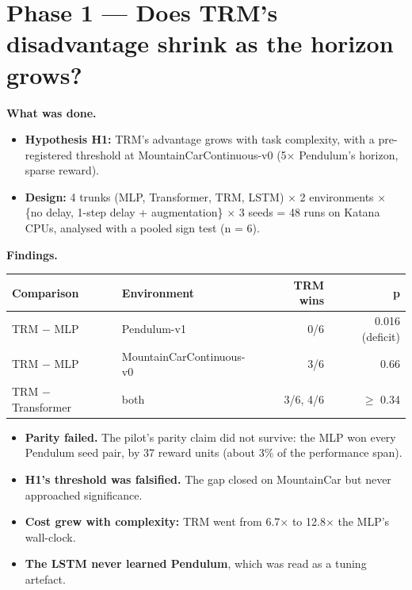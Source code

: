 \documentclass[11pt]{article}
\begin{document}
\medskip



\section*{Phase 1 --- Does TRM's disadvantage shrink as the horizon grows?}



\textbf{What was done.}

\begin{itemize}
\item \textbf{Hypothesis H1:} TRM's advantage grows with task complexity, with a pre-registered threshold at MountainCarContinuous-v0 (5$\times$ Pendulum's horizon, sparse reward).
\item \textbf{Design:} 4 trunks (MLP, Transformer, TRM, LSTM) $\times$ 2 environments $\times$ \{no delay, 1-step delay + augmentation\} $\times$ 3 seeds = 48 runs on Katana CPUs, analysed with a pooled sign test (n = 6).
\end{itemize}



\textbf{Findings.}



\begin{center}\small\begin{tabular}{llrr}
\toprule
Comparison & Environment & TRM wins & p \\
\midrule
TRM $-$ MLP & Pendulum-v1 & 0/6 & 0.016 (deficit) \\
TRM $-$ MLP & MountainCarContinuous-v0 & 3/6 & 0.66 \\
TRM $-$ Transformer & both & 3/6, 4/6 & $\geq$ 0.34 \\
\bottomrule
\end{tabular}\end{center}



\begin{itemize}
\item \textbf{Parity failed.} The pilot's parity claim did not survive: the MLP won every Pendulum seed pair, by 37 reward units (about 3\% of the performance span).
\item \textbf{H1's threshold was falsified.} The gap closed on MountainCar but never approached significance.
\item \textbf{Cost grew with complexity:} TRM went from 6.7$\times$ to 12.8$\times$ the MLP's wall-clock.
\item \textbf{The LSTM never learned Pendulum}, which was read as a tuning artefact.
\end{itemize}
\end{document}

